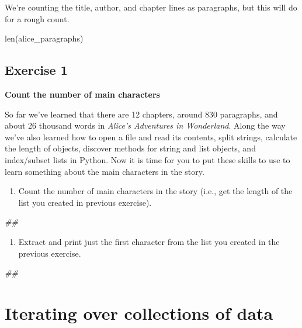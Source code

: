 \documentclass[]{book}
\newenvironment{Shaded}{\begin{snugshade}}{\end{snugshade}}
\newcommand{\CommentTok}[1]{\textcolor[rgb]{0.56,0.35,0.01}{\textit{#1}}}
\newcommand{\BuiltInTok}[1]{#1}
\newcommand{\NormalTok}[1]{#1}
\providecommand{\tightlist}{%
  \setlength{\itemsep}{0pt}\setlength{\parskip}{0pt}}
\begin{document}
We're counting the title, author, and chapter lines as paragraphs, but
this will do for a rough count.

\begin{Shaded}
\begin{Highlighting}[]
\BuiltInTok{len}\NormalTok{(alice_paragraphs)}
\end{Highlighting}
\end{Shaded}

\subsection{Exercise 1}\label{exercise-1-4}

\textbf{Count the number of main characters}

So far we've learned that there are 12 chapters, around 830 paragraphs,
and about 26 thousand words in \emph{Alice's Adventures in Wonderland}.
Along the way we've also learned how to open a file and read its
contents, split strings, calculate the length of objects, discover
methods for string and list objects, and index/subset lists in Python.
Now it is time for you to put these skills to use to learn something
about the main characters in the story.

\begin{enumerate}
\def\labelenumi{\arabic{enumi}.}
\tightlist
\item
  Count the number of main characters in the story (i.e., get the length
  of the list you created in previous exercise).
\end{enumerate}

\begin{Shaded}
\begin{Highlighting}[]
\CommentTok{##}
\end{Highlighting}
\end{Shaded}

\begin{enumerate}
\def\labelenumi{\arabic{enumi}.}
\setcounter{enumi}{1}
\tightlist
\item
  Extract and print just the first character from the list you created
  in the previous exercise.
\end{enumerate}

\begin{Shaded}
\begin{Highlighting}[]
\CommentTok{##}
\end{Highlighting}
\end{Shaded}

\section{Iterating over collections of
data}\label{iterating-over-collections-of-data}
\end{document}
